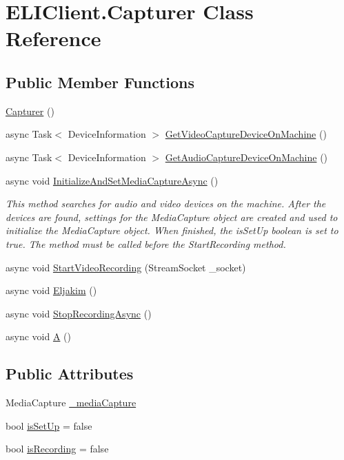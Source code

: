 \hypertarget{class_e_l_i_client_1_1_capturer}{}\section{E\+L\+I\+Client.\+Capturer Class Reference}
\label{class_e_l_i_client_1_1_capturer}
\subsection*{Public Member Functions}
\begin{DoxyCompactItemize}
\item 
\hyperlink{class_e_l_i_client_1_1_capturer_a3455ba52cb52e5297f02e95413eec9c5}{Capturer} ()
\item 
async Task$<$ Device\+Information $>$ \hyperlink{class_e_l_i_client_1_1_capturer_accf1111c1021efa12abdb1ebc7e2f394}{Get\+Video\+Capture\+Device\+On\+Machine} ()
\item 
async Task$<$ Device\+Information $>$ \hyperlink{class_e_l_i_client_1_1_capturer_a1b8998f20c6a85835fdbb900383c9e18}{Get\+Audio\+Capture\+Device\+On\+Machine} ()
\item 
async void \hyperlink{class_e_l_i_client_1_1_capturer_a5e64d7010dccca9d81ce8e758372a663}{Initialize\+And\+Set\+Media\+Capture\+Async} ()
\begin{DoxyCompactList}\small\item\em This method searches for audio and video devices on the machine. After the devices are found, settings for the Media\+Capture object are created and used to initialize the Media\+Capture object. When finished, the is\+Set\+Up boolean is set to true. The method must be called before the Start\+Recording method. \end{DoxyCompactList}\item 
async void \hyperlink{class_e_l_i_client_1_1_capturer_a1532b94ee46eaef800f439b120ba1875}{Start\+Video\+Recording} (Stream\+Socket \+\_\+socket)
\item 
async void \hyperlink{class_e_l_i_client_1_1_capturer_a1804509b6a4af7aff8d08943bb59da76}{Eljakim} ()
\item 
async void \hyperlink{class_e_l_i_client_1_1_capturer_a0b99d531c208233d08e9cb531f1e27ca}{Stop\+Recording\+Async} ()
\item 
async void \hyperlink{class_e_l_i_client_1_1_capturer_a9a472a3f53feb00c6bb1bb0689e52872}{A} ()
\end{DoxyCompactItemize}
\subsection*{Public Attributes}
\begin{DoxyCompactItemize}
\item 
Media\+Capture \hyperlink{class_e_l_i_client_1_1_capturer_afce477fff2b67de230a211ff3f639201}{\+\_\+media\+Capture}
\item 
bool \hyperlink{class_e_l_i_client_1_1_capturer_a99b1a695b80e8984744c065862eceb3e}{is\+Set\+Up} = false
\item 
bool \hyperlink{class_e_l_i_client_1_1_capturer_a2063ed98b28c4a20315abb65c46954fd}{is\+Recording} = false
\end{DoxyCompactItemize}
